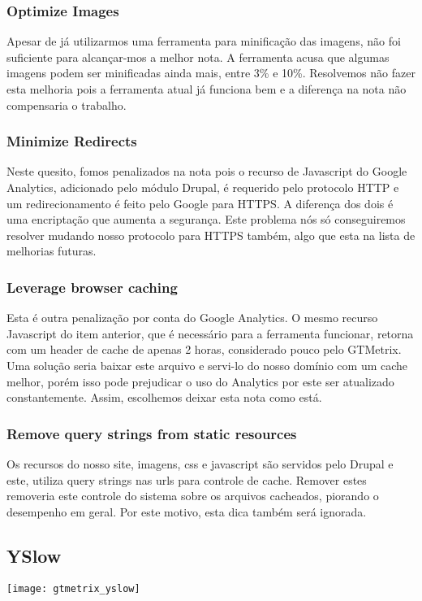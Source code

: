 \subsubsection{Optimize Images}
Apesar de já utilizarmos uma ferramenta para minificação das imagens, não foi suficiente para alcançar-mos a melhor nota. A ferramenta acusa que algumas imagens podem ser minificadas ainda mais, entre 3\% e 10\%. Resolvemos não fazer esta melhoria pois a ferramenta atual já funciona bem e a diferença na nota não compensaria o trabalho.

\subsubsection{Minimize Redirects}
Neste quesito, fomos penalizados na nota pois o recurso de Javascript do Google Analytics, adicionado pelo módulo Drupal, é requerido pelo protocolo HTTP e um redirecionamento é feito pelo Google para HTTPS. A diferença dos dois é uma encriptação que aumenta a segurança. Este problema nós só conseguiremos resolver mudando nosso protocolo para HTTPS também, algo que esta na lista de melhorias futuras.

\subsubsection{Leverage browser caching}
Esta é outra penalização por conta do Google Analytics. O mesmo recurso Javascript do item anterior, que é necessário para a ferramenta funcionar, retorna com um header de cache de apenas 2 horas, considerado pouco pelo GTMetrix. Uma solução seria baixar este arquivo e servi-lo do nosso domínio com um cache melhor, porém isso pode prejudicar o uso do Analytics por este ser atualizado constantemente. Assim, escolhemos deixar esta nota como está.

\subsubsection{Remove query strings from static resources}
Os recursos do nosso site, imagens, css e javascript são servidos pelo Drupal e este, utiliza query strings nas urls para controle de cache. Remover estes removeria este controle do sistema sobre os arquivos cacheados, piorando o desempenho em geral. Por este motivo, esta dica também será ignorada.

\subsection{YSlow}
\texttt{[image: gtmetrix\_yslow]}

